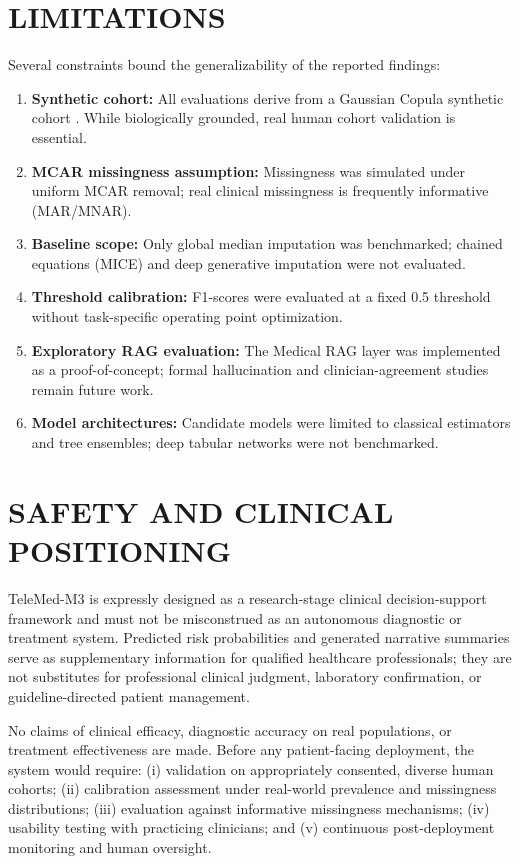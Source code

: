 \documentclass[10pt,twocolumn,letterpaper]{article}
\begin{document}
\section{LIMITATIONS}
Several constraints bound the generalizability of the reported findings:
\begin{enumerate}
    \item \textbf{Synthetic cohort:} All evaluations derive from a Gaussian Copula synthetic cohort \citep{xu2015sdv}. While biologically grounded, real human cohort validation is essential.
    \item \textbf{MCAR missingness assumption:} Missingness was simulated under uniform MCAR removal; real clinical missingness is frequently informative (MAR/MNAR).
    \item \textbf{Baseline scope:} Only global median imputation was benchmarked; chained equations (MICE) and deep generative imputation were not evaluated.
    \item \textbf{Threshold calibration:} F1-scores were evaluated at a fixed 0.5 threshold without task-specific operating point optimization.
    \item \textbf{Exploratory RAG evaluation:} The Medical RAG layer was implemented as a proof-of-concept; formal hallucination and clinician-agreement studies remain future work.
    \item \textbf{Model architectures:} Candidate models were limited to classical estimators and tree ensembles; deep tabular networks were not benchmarked.
\end{enumerate}

\section{SAFETY AND CLINICAL POSITIONING}
TeleMed-M3 is expressly designed as a research-stage clinical decision-support framework and must not be misconstrued as an autonomous diagnostic or treatment system. Predicted risk probabilities and generated narrative summaries serve as supplementary information for qualified healthcare professionals; they are not substitutes for professional clinical judgment, laboratory confirmation, or guideline-directed patient management.

No claims of clinical efficacy, diagnostic accuracy on real populations, or treatment effectiveness are made. Before any patient-facing deployment, the system would require: (i) validation on appropriately consented, diverse human cohorts; (ii) calibration assessment under real-world prevalence and missingness distributions; (iii) evaluation against informative missingness mechanisms; (iv) usability testing with practicing clinicians; and (v) continuous post-deployment monitoring and human oversight.
\end{document}
